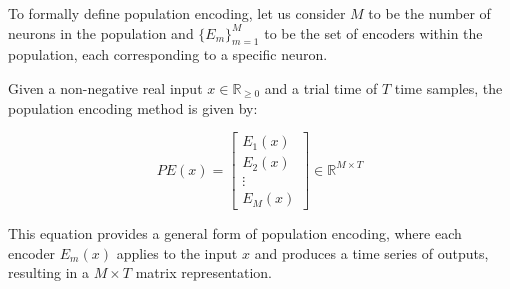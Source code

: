 To formally define population encoding, let us consider $M$ to be the number of neurons in the population and $\{ E_m \}_{m=1}^{M}$ to be the set of encoders within the population, each corresponding to a specific neuron.

Given a non-negative real input $x \in \mathbb{R}_{\geq 0}$ and a trial time of $T$ time samples, the population encoding method is given by:

\begin{equation}
    PE(x) = 
    \begin{bmatrix} E_{1}(x) \\ E_{2}(x) \\ \vdots \\ E_{M}(x) \end{bmatrix} \in \mathbb{R}^{M \times T}
\end{equation}

This equation provides a general form of population encoding, where each encoder $E_m(x)$ applies to the input $x$ and produces a time series of outputs, resulting in a $M \times T$ matrix representation.

